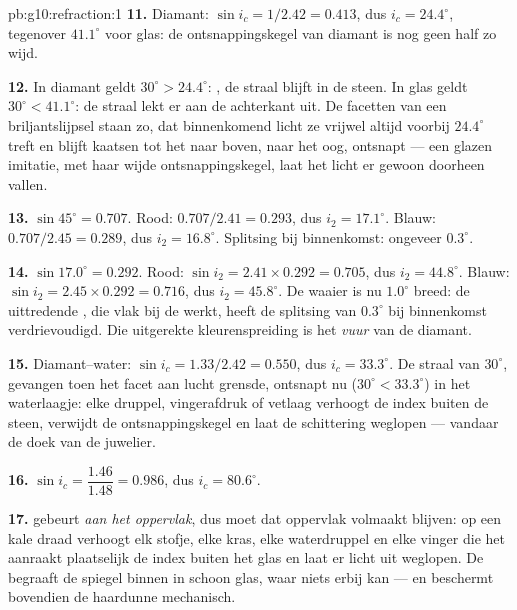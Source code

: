 \begin{solution}{pb:g10:refraction:1}
\textbf{11.} Diamant: $\sin i_c = 1/2.42 = 0.413$, dus
$i_c = 24.4^\circ$, tegenover $41.1^\circ$ voor glas: de
ontsnappingskegel van diamant is nog geen half zo wijd.

\textbf{12.} In diamant geldt $30^\circ > 24.4^\circ$: , de straal blijft in de steen. In glas geldt
$30^\circ < 41.1^\circ$: de straal lekt er aan de achterkant uit. De
facetten van een briljantslijpsel staan zo, dat binnenkomend licht ze
vrijwel altijd voorbij $24.4^\circ$ treft en blijft kaatsen tot het naar
boven, naar het oog, ontsnapt --- een glazen imitatie, met haar wijde
ontsnappingskegel, laat het licht er gewoon doorheen vallen.

\textbf{13.} $\sin 45^\circ = 0.707$. Rood: $0.707/2.41 = 0.293$, dus
$i_2 = 17.1^\circ$. Blauw: $0.707/2.45 = 0.289$, dus $i_2 = 16.8^\circ$.
Splitsing bij binnenkomst: ongeveer $0.3^\circ$.

\textbf{14.} $\sin 17.0^\circ = 0.292$. Rood: $\sin i_2 = 2.41 \times
0.292 = 0.705$, dus $i_2 = 44.8^\circ$. Blauw: $\sin i_2 = 2.45 \times
0.292 = 0.716$, dus $i_2 = 45.8^\circ$. De waaier is nu $1.0^\circ$
breed: de uittredende , die vlak bij de  werkt, heeft de
splitsing van $0.3^\circ$ bij binnenkomst verdrievoudigd. Die uitgerekte
kleurenspreiding is het \emph{vuur} van de diamant.

\textbf{15.} Diamant--water: $\sin i_c = 1.33/2.42 = 0.550$, dus
$i_c = 33.3^\circ$. De straal van $30^\circ$, gevangen toen het facet aan
lucht grensde, ontsnapt nu ($30^\circ < 33.3^\circ$) in het waterlaagje:
elke druppel, vingerafdruk of vetlaag verhoogt de index buiten de steen,
verwijdt de ontsnappingskegel en laat de schittering weglopen --- vandaar
de doek van de juwelier.

\textbf{16.} $\sin i_c = \dfrac{1.46}{1.48} = 0.986$, dus
$i_c = 80.6^\circ$.

\textbf{17.}  gebeurt \emph{aan het oppervlak}, dus
moet dat oppervlak volmaakt blijven: op een kale draad verhoogt elk
stofje, elke kras, elke waterdruppel en elke vinger die het aanraakt
plaatselijk de index buiten het glas en laat er licht uit weglopen. De
 begraaft de spiegel binnen in schoon glas, waar niets erbij kan
--- en beschermt bovendien de haardunne  mechanisch.


\end{solution}
